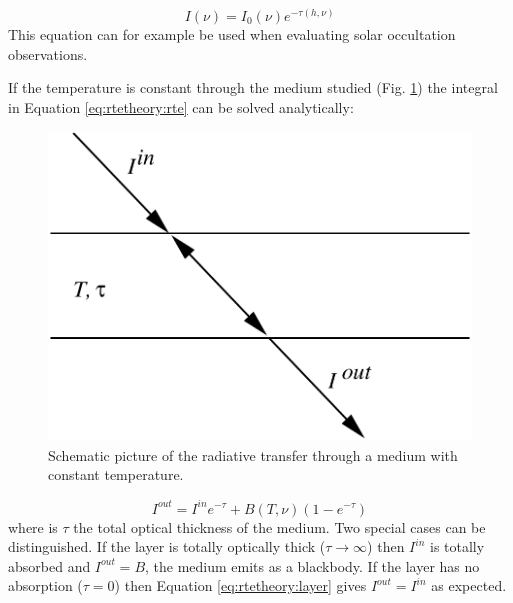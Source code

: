  \begin{equation}
   I(\nu) = I_0(\nu)e^{-\tau(h,\nu)}
  \label{eq:rtetheory:beer}
 \end{equation}  
 This equation can for example be used when evaluating solar
 occultation observations.  
 
 If the temperature is constant through the medium studied (Fig.
 \ref{fig:rtetheory:layer}) the integral in Equation \ref{eq:rtetheory:rte} can
 be solved analytically:

 \begin{figure}
  \begin{center}
   \begin{minipage}[c]{0.4\textwidth}
    \centering
    \caption{Schematic picture of the radiative transfer through a medium with
             constant temperature.}
    \label{fig:rtetheory:layer}
   \end{minipage}%
   \hspace{0.05\textwidth}%
   \begin{minipage}[c]{0.50\textwidth}
    \centering
    \includegraphics*[width=0.99\hsize]{fig_layer}
   \end{minipage}
  \end{center}
 \end{figure}   
  
 \begin{equation}
   I^{out} = I^{in}e^{-\tau} + B(T,\nu)(1-e^{-\tau})
  \label{eq:rtetheory:layer}
 \end{equation}  
 where is $\tau$ the total optical thickness of the medium. Two
 special cases can be distinguished. If the layer is totally optically
 thick ($\tau \to \infty$) then $I^{in}$ is totally absorbed and
 $I^{out} = B$, the medium emits as a blackbody. If the layer has no
 absorption ($\tau=0$) then Equation \ref{eq:rtetheory:layer} gives
 $I^{out} = I^{in}$ as expected.
 
